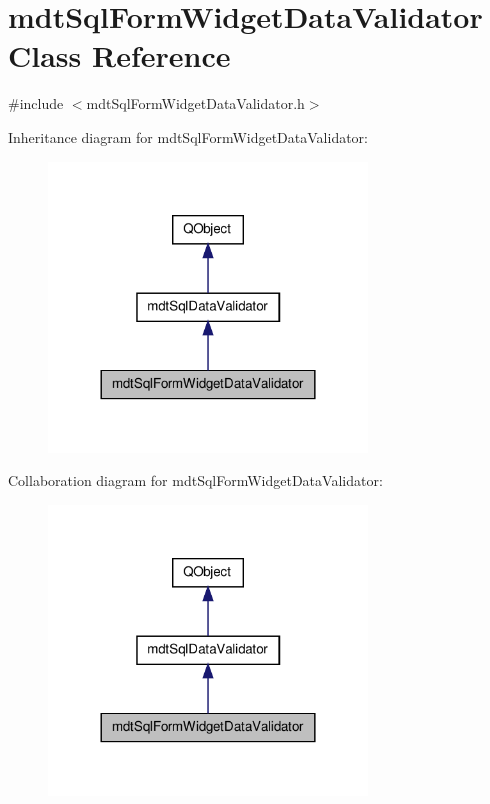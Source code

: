 \hypertarget{classmdt_sql_form_widget_data_validator}{\section{mdt\-Sql\-Form\-Widget\-Data\-Validator Class Reference}
\label{classmdt_sql_form_widget_data_validator}
}


{\ttfamily \#include $<$mdt\-Sql\-Form\-Widget\-Data\-Validator.\-h$>$}



Inheritance diagram for mdt\-Sql\-Form\-Widget\-Data\-Validator\-:
\nopagebreak
\begin{figure}[H]
\begin{center}
\leavevmode
\includegraphics[width=240pt]{classmdt_sql_form_widget_data_validator__inherit__graph}
\end{center}
\end{figure}


Collaboration diagram for mdt\-Sql\-Form\-Widget\-Data\-Validator\-:
\nopagebreak
\begin{figure}[H]
\begin{center}
\leavevmode
\includegraphics[width=240pt]{classmdt_sql_form_widget_data_validator__coll__graph}
\end{center}
\end{figure}
